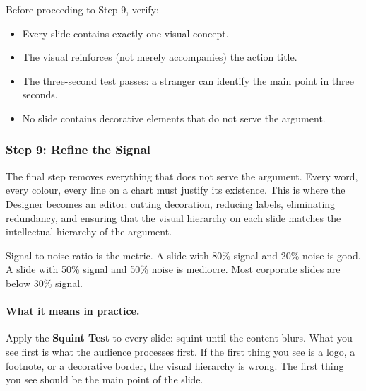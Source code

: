 \begin{keybox}
Before proceeding to Step 9, verify:
\begin{itemize}[leftmargin=1.2em]
  \item Every slide contains exactly one visual concept.
  \item The visual reinforces (not merely accompanies) the action title.
  \item The three-second test passes: a stranger can identify the main point in three seconds.
  \item No slide contains decorative elements that do not serve the argument.
\end{itemize}
\end{keybox}

\subsubsection{Step 9: Refine the Signal}

The final step removes everything that does not serve the argument. Every word, every colour, every line on a chart must justify its existence. This is where the Designer becomes an editor: cutting decoration, reducing labels, eliminating redundancy, and ensuring that the visual hierarchy on each slide matches the intellectual hierarchy of the argument.

Signal-to-noise ratio is the metric. A slide with 80\% signal and 20\% noise is good. A slide with 50\% signal and 50\% noise is mediocre. Most corporate slides are below 30\% signal.

\paragraph{What it means in practice.} Apply the \textbf{Squint Test} to every slide: squint until the content blurs. What you see first is what the audience processes first. If the first thing you see is a logo, a footnote, or a decorative border, the visual hierarchy is wrong. The first thing you see should be the main point of the slide.

